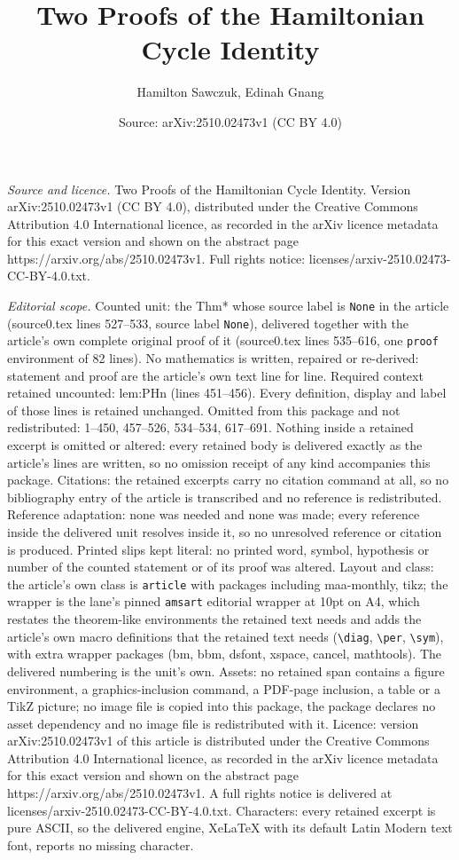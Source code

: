 \documentclass[10pt,a4paper]{amsart}
\title[Two Proofs of the Hamiltonian Cycle Identity]{Two Proofs of the Hamiltonian Cycle Identity}
\author{Hamilton Sawczuk, Edinah Gnang}
\date{Source: arXiv:2510.02473v1 (CC BY 4.0)}
\begin{document}
\maketitle

\noindent\emph{Source and licence.} Two Proofs of the Hamiltonian Cycle Identity. Version arXiv:2510.02473v1 (CC BY 4.0), distributed under the Creative Commons Attribution 4.0 International licence, as recorded in the arXiv licence metadata for this exact version and shown on the abstract page https://arxiv.org/abs/2510.02473v1. Full rights notice: licenses/arxiv-2510.02473-CC-BY-4.0.txt.\par\smallskip

\noindent\textit{Editorial scope.} Counted unit: the Thm* whose source label is \texttt{None} in the article (source0.tex lines 527--533, source label \texttt{None}), delivered together with the article's own complete original proof of it (source0.tex lines 535--616, one \texttt{proof} environment of 82 lines). No mathematics is written, repaired or re-derived: statement and proof are the article's own text line for line. Required context retained uncounted: lem:PHn (lines 451--456). Every definition, display and label of those lines is retained unchanged. Omitted from this package and not redistributed: 1--450, 457--526, 534--534, 617--691. Nothing inside a retained excerpt is omitted or altered: every retained body is delivered exactly as the article's lines are written, so no omission receipt of any kind accompanies this package. Citations: the retained excerpts carry no citation command at all, so no bibliography entry of the article is transcribed and no reference is redistributed. Reference adaptation: none was needed and none was made; every reference inside the delivered unit resolves inside it, so no unresolved reference or citation is produced. Printed slips kept literal: no printed word, symbol, hypothesis or number of the counted statement or of its proof was altered. Layout and class: the article's own class is \texttt{article} with packages including maa-monthly, tikz; the wrapper is the lane's pinned \texttt{amsart} editorial wrapper at 10pt on A4, which restates the theorem-like environments the retained text needs and adds the article's own macro definitions that the retained text needs (\texttt{\textbackslash diag}, \texttt{\textbackslash per}, \texttt{\textbackslash sym}), with extra wrapper packages (bm, bbm, dsfont, xspace, cancel, mathtools). The delivered numbering is the unit's own. Assets: no retained span contains a figure environment, a graphics-inclusion command, a PDF-page inclusion, a table or a TikZ picture; no image file is copied into this package, the package declares no asset dependency and no image file is redistributed with it. Licence: version arXiv:2510.02473v1 of this article is distributed under the Creative Commons Attribution 4.0 International licence, as recorded in the arXiv licence metadata for this exact version and shown on the abstract page https://arxiv.org/abs/2510.02473v1. A full rights notice is delivered at licenses/arxiv-2510.02473-CC-BY-4.0.txt. Characters: every retained excerpt is pure ASCII, so the delivered engine, XeLaTeX with its default Latin Modern text font, reports no missing character.
\end{document}
